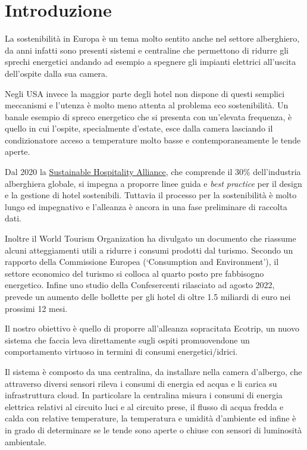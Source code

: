 
\section{Introduzione}

La sostenibilità in Europa è un tema molto sentito anche nel settore alberghiero, da anni infatti sono presenti sistemi e centraline che permettono di ridurre gli sprechi energetici andando ad esempio a spegnere gli impianti elettrici all'uscita dell'ospite dalla sua camera.

Negli USA invece la maggior parte degli hotel non dispone di questi semplici meccanismi e l'utenza è molto meno attenta al problema eco sostenibilità. Un banale esempio di spreco energetico che si presenta con un'elevata frequenza, è quello in cui l'ospite, specialmente d'estate, esce dalla camera lasciando il condizionatore acceso a temperature molto basse e contemporaneamente le tende aperte.

Dal 2020 la \href{https://sustainablehospitalityalliance.org/}{Sustainable Hospitality Alliance}, che comprende il 30\% dell'industria alberghiera globale, si impegna a proporre linee guida e \textit{best practice} per il design e la gestione di hotel sostenibili. Tuttavia il processo per la sostenibilità è molto lungo ed impegnativo e l'alleanza è ancora in una fase preliminare di raccolta dati.

Inoltre il World Tourism Organization ha divulgato un documento che riassume alcuni atteggiamenti utili a ridurre i consumi prodotti dal turismo. Secondo un rapporto della Commissione Europea (‘Consumption and Environment’), il settore economico del turismo si colloca al quarto posto pre fabbisogno energetico. Infine uno studio della Confesercenti rilasciato ad agosto 2022, prevede un aumento delle bollette per gli hotel di oltre 1.5 miliardi di euro nei prossimi 12 mesi.

Il nostro obiettivo è quello di proporre all'alleanza sopracitata Ecotrip, un nuovo sistema che faccia leva direttamente sugli ospiti promuovendone un comportamento virtuoso in termini di consumi energetici/idrici. 

Il sistema è composto da una centralina, da installare nella camera d'albergo, che attraverso diversi sensori rileva i consumi di energia ed acqua e li carica su infrastruttura cloud.
In particolare la centralina misura i consumi di energia elettrica relativi al circuito luci e al circuito prese, il flusso di acqua fredda e calda con relative temperature,
la temperatura e umidità d'ambiente ed infine è in grado di determinare se le tende sono aperte o chiuse con sensori di luminosità ambientale.

